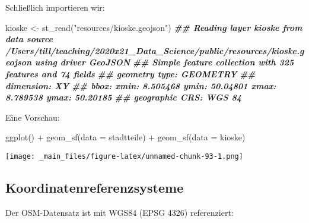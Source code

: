 \documentclass[
  ngerman,
]{article}
\newenvironment{Shaded}{\begin{snugshade}}{\end{snugshade}}
\newcommand{\AttributeTok}[1]{\textcolor[rgb]{0.77,0.63,0.00}{#1}}
\newcommand{\DocumentationTok}[1]{\textcolor[rgb]{0.56,0.35,0.01}{\textbf{\textit{#1}}}}
\newcommand{\FunctionTok}[1]{\textcolor[rgb]{0.00,0.00,0.00}{#1}}
\newcommand{\NormalTok}[1]{#1}
\newcommand{\OtherTok}[1]{\textcolor[rgb]{0.56,0.35,0.01}{#1}}
\newcommand{\SpecialCharTok}[1]{\textcolor[rgb]{0.00,0.00,0.00}{#1}}
\newcommand{\StringTok}[1]{\textcolor[rgb]{0.31,0.60,0.02}{#1}}
\begin{document}
Schließlich importieren wir:

\begin{Shaded}
\begin{Highlighting}[]
\NormalTok{kioske }\OtherTok{\textless{}{-}} \FunctionTok{st\_read}\NormalTok{(}\StringTok{"resources/kioske.geojson"}\NormalTok{)}
\DocumentationTok{\#\# Reading layer \textasciigrave{}kioske\textquotesingle{} from data source \textasciigrave{}/Users/till/teaching/2020x21\_Data\_Science/public/resources/kioske.geojson\textquotesingle{} using driver \textasciigrave{}GeoJSON\textquotesingle{}}
\DocumentationTok{\#\# Simple feature collection with 325 features and 74 fields}
\DocumentationTok{\#\# geometry type:  GEOMETRY}
\DocumentationTok{\#\# dimension:      XY}
\DocumentationTok{\#\# bbox:           xmin: 8.505468 ymin: 50.04801 xmax: 8.789538 ymax: 50.20185}
\DocumentationTok{\#\# geographic CRS: WGS 84}
\end{Highlighting}
\end{Shaded}

Eine Vorschau:

\begin{Shaded}
\begin{Highlighting}[]
\FunctionTok{ggplot}\NormalTok{() }\SpecialCharTok{+}
  \FunctionTok{geom\_sf}\NormalTok{(}\AttributeTok{data =}\NormalTok{ stadtteile) }\SpecialCharTok{+}
  \FunctionTok{geom\_sf}\NormalTok{(}\AttributeTok{data =}\NormalTok{ kioske)}
\end{Highlighting}
\end{Shaded}

\texttt{[image: \_main\_files/figure-latex/unnamed-chunk-93-1.png]}

\hypertarget{koordinatenreferenzsysteme}{%
\subsection{Koordinatenreferenzsysteme}\label{koordinatenreferenzsysteme}}

Der OSM-Datensatz ist mit WGS84 (EPSG 4326) referenziert:
\end{document}
